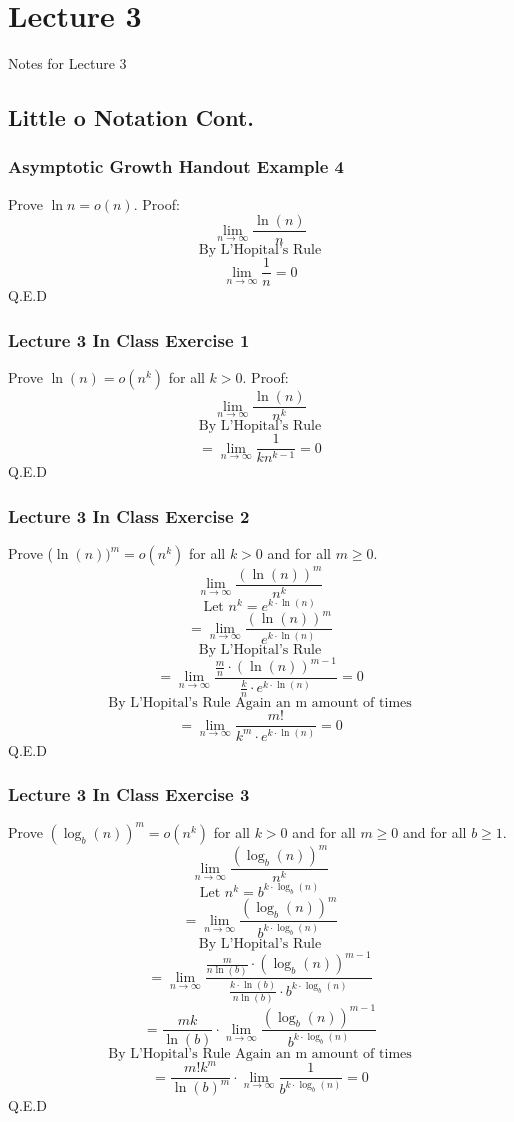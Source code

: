 \documentclass{article}
\begin{document}
\section{Lecture 3}

Notes for Lecture 3

\subsection{Little o Notation Cont.}

\subsubsection{Asymptotic Growth Handout Example 4}
Prove $\ln{n} = o(n)$.
Proof:
$$\lim_{n \rightarrow \infty} \frac{\ln{(n)}}{n}$$
$$\text{By L'Hopital's Rule}$$
$$\lim_{n \rightarrow \infty} \frac{1}{n} = 0$$
Q.E.D

\subsubsection{Lecture 3 In Class Exercise 1}
Prove $\ln{(n)} = o(n^k)$ for all $k > 0$.
Proof:
$$\lim_{n \rightarrow \infty} \frac{\ln{(n)}}{n^k}$$
$$\text{By L'Hopital's Rule}$$
$$=\lim_{n \rightarrow \infty} \frac{1}{kn^{k-1}} = 0$$
Q.E.D

\subsubsection{Lecture 3 In Class Exercise 2}
Prove ($\ln{(n)})^m = o(n^k)$ for all $k > 0$ and for all $m \geq 0$.
$$\lim_{n \rightarrow \infty} \frac{(\ln{(n)})^m}{n^k}$$
$$\text{Let } n^k = e^{k \cdot \ln{(n)}}$$
$$=\lim_{n \rightarrow \infty} \frac{(\ln{(n)})^m}{e^{k \cdot \ln{(n)}}}$$
$$\text{By L'Hopital's Rule}$$
$$=\lim_{n \rightarrow \infty} \frac{ \frac{m}{n} \cdot (\ln{(n)})^{m-1}}  { \frac{k}{n} \cdot e^{k \cdot \ln{(n)}}} = 0$$
$$\text{By L'Hopital's Rule Again an m amount of times}$$
$$=\lim_{n \rightarrow \infty} \frac{ m! }  { k^m \cdot e^{k \cdot \ln{(n)}}} = 0$$
Q.E.D

\subsubsection{Lecture 3 In Class Exercise 3}
Prove $(\log_{b}{(n)})^m = o(n^k)$ for all $k > 0$ and for all $m \geq 0$ and for all $b \geq 1$.
$$\lim_{n \rightarrow \infty} \frac{(\log_{b}{(n)})^m}{n^k}$$
$$\text{Let } n^k = b^{k \cdot \log_{b}{(n)}}$$
$$=\lim_{n \rightarrow \infty} \frac{(\log_{b}{(n)})^m}{b^{k \cdot \log_{b}{(n)}}}$$
$$\text{By L'Hopital's Rule}$$
$$= \lim_{n \rightarrow \infty} \frac{ \frac{m}{n\ln{(b)}} \cdot (\log_{b}{(n)})^{m-1}}{ \frac{k \cdot \ln{(b)}}{n\ln{(b)}} \cdot b^{k \cdot \log_{b}{(n)}}}$$
$$= \frac{mk}{\ln{(b)}} \cdot \lim_{n \rightarrow \infty} \frac{(\log_{b}{(n)})^{m-1}}{ b^{k \cdot\log_{b}{(n)}}}$$
$$\text{By L'Hopital's Rule Again an m amount of times}$$
$$= \frac{m!k^m}{\ln{(b)}^m} \cdot \lim_{n \rightarrow \infty} \frac{1}{ b^{k \cdot\log_{b}{(n)}}} = 0 $$
Q.E.D
\end{document}
